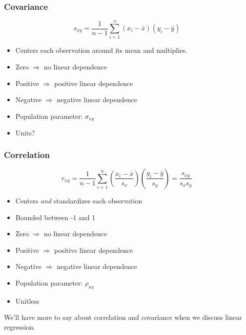 \begin{frame}
\frametitle{Covariance}
	$$s_{xy} = \frac{1}{n-1} \sum_{i=1}^n (x_i -\bar{x})(y_i - \bar{y})$$

\begin{itemize}
	\item Centers each observation around its mean and multiplies.
	\item Zero $\Rightarrow$ no linear dependence
	\item Positive $\Rightarrow$ positive linear dependence
	\item Negative $\Rightarrow$ negative linear dependence
	\item Population parameter: $\sigma_{xy}$
	\item Units?
\end{itemize}
\end{frame}
\begin{frame}
\frametitle{Correlation}
	$$r_{xy} = \frac{1}{n-1} \sum_{i=1}^n \left(\frac{x_i -\bar{x}}{s_x}\right)\left(\frac{y_i - \bar{y}}{s_y}\right) = \frac{s_{xy}}{s_x s_y}$$

\begin{itemize}
	\item Centers \emph{and} standardizes each observation 
	\item Bounded between -1 and 1
	\item Zero $\Rightarrow$ no linear dependence
	\item Positive $\Rightarrow$ positive linear dependence
	\item Negative $\Rightarrow$ negative linear dependence
	\item Population parameter: $\rho_{xy}$
	\item Unitless
\end{itemize}
\end{frame}
\begin{frame}
\Large \alert{We'll have more to say about correlation and covariance when we discuss linear regression.}
\end{frame}

